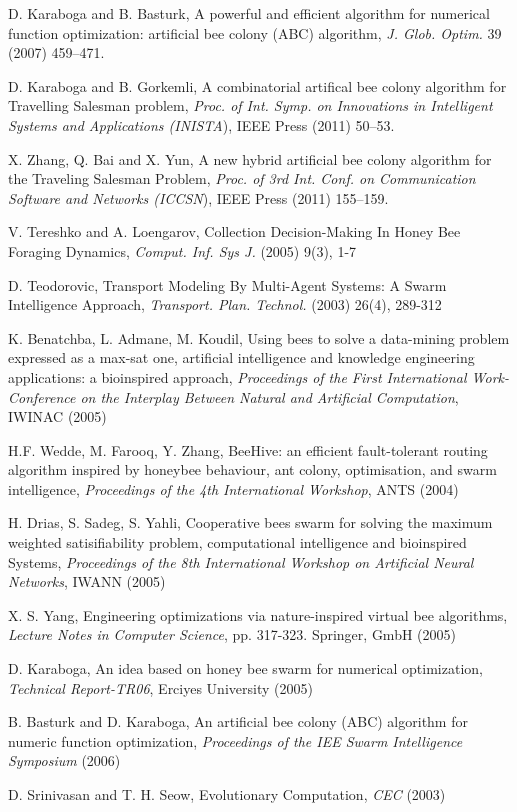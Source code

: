 \documentclass{article}
\begin{document}
\begin{thebibliography}{99}

 D. Karaboga and B. Basturk, A powerful and efficient algorithm for numerical function optimization: artificial bee colony (ABC) algorithm, \emph{J. Glob. Optim.\/} 39 (2007) 459--471.

 D. Karaboga and B. Gorkemli, A combinatorial artifical bee colony algorithm for Travelling Salesman problem, \emph{Proc. of Int. Symp. on Innovations in Intelligent Systems and Applications \emph{(}INISTA\/}), IEEE Press (2011) 50--53.

 X. Zhang, Q. Bai and X. Yun, A new hybrid artificial bee colony algorithm for the Traveling Salesman Problem, \emph{Proc. of \emph{3}rd Int. Conf. on Communication Software and Networks \emph{(}ICCSN\/}), IEEE Press (2011) 155--159.

 V. Tereshko and A. Loengarov, Collection Decision-Making In Honey Bee Foraging Dynamics, \textit{Comput. Inf. Sys J.}  (2005) 9(3), 1-7

 D. Teodorovic, Transport Modeling By Multi-Agent Systems: A Swarm Intelligence Approach, \textit{Transport. Plan. Technol.}  (2003) 26(4), 289-312

 K. Benatchba, L. Admane, M. Koudil, Using bees to solve a data-mining problem expressed as a max-sat one, artificial intelligence and knowledge engineering applications: a bioinspired approach, \textit{Proceedings of the First International Work-Conference on the Interplay Between Natural and Artificial Computation}, IWINAC (2005)

 H.F. Wedde, M. Farooq, Y. Zhang, BeeHive: an efficient fault-tolerant routing algorithm inspired by honeybee behaviour, ant colony, optimisation, and swarm intelligence, \textit{Proceedings of the 4th International Workshop}, ANTS (2004)

 H. Drias, S. Sadeg, S. Yahli, Cooperative bees swarm for solving the maximum weighted satisifiability problem, computational intelligence and bioinspired Systems, \textit{Proceedings of the 8th International Workshop on Artificial Neural Networks}, IWANN (2005)

 X. S. Yang, Engineering optimizations via nature-inspired virtual bee algorithms, \textit{Lecture Notes in Computer Science}, pp. 317-323. Springer, GmbH (2005)

 D. Karaboga, An idea based on honey bee swarm for numerical optimization, \textit{Technical Report-TR06}, Erciyes University (2005)

 B. Basturk and D. Karaboga, An artificial bee colony (ABC) algorithm for numeric function optimization, \textit{Proceedings of the IEE Swarm Intelligence Symposium} (2006)

 D. Srinivasan and T. H. Seow, Evolutionary Computation, \textit{CEC} (2003)

\end{thebibliography}
\end{document}
